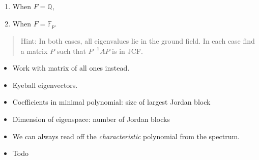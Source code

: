 \begin{enumerate}
\def\labelenumi{\alph{enumi}.}
\item
  When \(F = {\mathbb{Q}}\),
\item
  When \(F = {\mathbb{F}}_p\).
\end{enumerate}

\begin{quote}
Hint: In both cases, all eigenvalues lie in the ground field. In each
case find a matrix \(P\) such that \(P^{-1}AP\) is in JCF.
\end{quote}

\begin{strategy}

\envlist

\begin{itemize}
\tightlist
\item
  Work with matrix of all ones instead.
\item
  Eyeball eigenvectors.
\item
  Coefficients in minimal polynomial: size of largest Jordan block
\item
  Dimension of eigenspace: number of Jordan blocks
\item
  We can always read off the \emph{characteristic} polynomial from the
  spectrum.
\end{itemize}

\end{strategy}

\begin{concept}

\envlist

\begin{itemize}
\tightlist
\item
  Todo
\end{itemize}

\end{concept}

